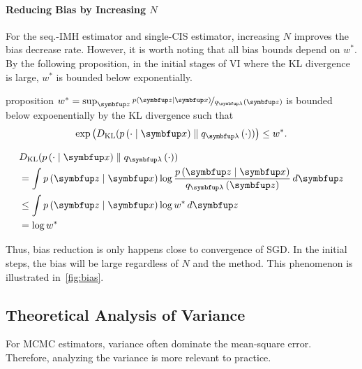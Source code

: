\paragraph{Reducing Bias by Increasing \(N\)}
For the seq.-IMH estimator and single-CIS estimator, increasing \(N\) improves the bias decrease rate.
However, it is worth noting that all bias bounds depend on \(w^*\).
By the following proposition, in the initial stages of VI where the KL divergence is large, \(w^*\) is bounded below exponentially.

\begin{theoremEnd}{proposition}
  \(w^* = \sup_{\vz} \nicefrac{p\left(\vz\mid\vx\right)}{q_{\vlambda}\left(\vz\right)} \) is bounded below expoenentially by the KL divergence such that
  \[
  \exp\left(\DKL{p\left(\cdot\mid\vx\right)}{ q_{\vlambda}\left(\cdot\right) }\right) \leq w^*.
  \]
\end{theoremEnd}
\begin{proofEnd}
  \begin{align}
    &\DKL{p\left(\cdot\mid\vx\right)}{ q_{\vlambda}\left(\cdot\right) } \\
    &= \int p\left(\vz\mid\vx\right) \log \frac{p\left(\vz\mid\vx\right)}{q_{\vlambda}\left(\vz\right)}\,d\vz \\
    &\leq \int p\left(\vz\mid\vx\right) \log w^* \, d\vz \\
    &= \log w^*
  \end{align}
\end{proofEnd}

Thus, bias reduction is only happens close to convergence of SGD.
In the initial steps, the bias will be large regardless of \(N\) and the method.
This phenomenon is illustrated in~\cref{fig:bias}.

\subsection{Theoretical Analysis of Variance}
For MCMC estimators, variance often dominate the mean-square error.
Therefore, analyzing the variance is more relevant to practice.

